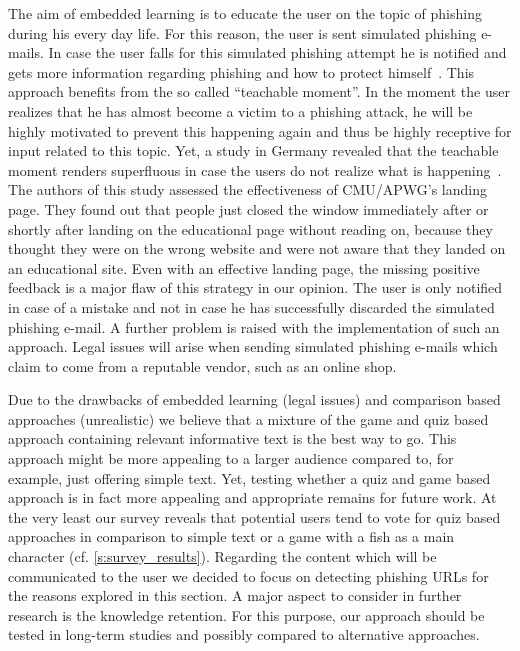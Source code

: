 \begin{description}[leftmargin=0cm]
	\item[Embedded Learning:] The aim of embedded learning is to educate the user on the topic of phishing during his every day life.
 For this reason, the user is sent simulated phishing e-mails.
 In case the user falls for this simulated phishing attempt he is notified and gets more information regarding phishing and how to protect himself~\cite{embedded2011jansson, kumaraguru2009phishguru}. 
This approach benefits from the so called ``teachable moment''. 
In the moment the user realizes that he has almost become a victim to a phishing attack, he will be highly motivated to prevent this happening again and thus be highly receptive for input related to this topic.
 Yet, a study in Germany revealed that the teachable moment renders superfluous in case the users do not realize what is happening~\cite{TUD-CS-2013-0167}.
 The authors of this study assessed the effectiveness of CMU/APWG's landing page. 
They found out that people just closed the window immediately after or shortly after landing on the educational page without reading on,  because they thought they were on the wrong website and were not aware that they landed on an educational site.
 Even with an effective landing page, the missing positive feedback is a major flaw of this strategy in our opinion.
 The user is only notified in case of a mistake and not in case he has successfully discarded the simulated phishing e-mail.
 A further problem is raised with the implementation of such an approach.
 Legal issues will arise when sending simulated phishing e-mails which claim to come from a reputable vendor, such as an online shop.
\end{description}
Due to the drawbacks of embedded learning (legal issues) and comparison based approaches (unrealistic) we believe that a mixture of the game and quiz based approach containing relevant informative text is the best way to go.
This approach might be more appealing to a larger audience compared to, for example, just offering simple text.
Yet, testing whether a quiz and game based approach is in fact more appealing and appropriate remains for future work.
At the very least our survey reveals that potential users tend to vote for quiz based approaches in comparison to simple text or a game with a fish as a main character (cf. \autoref{s:survey_results}).
Regarding the content which will be communicated to the user we decided to focus on detecting phishing URLs for the reasons explored in this section.
A major aspect to consider in further research is the knowledge retention.
For this purpose, our approach should be tested in long-term studies and possibly compared to alternative approaches.